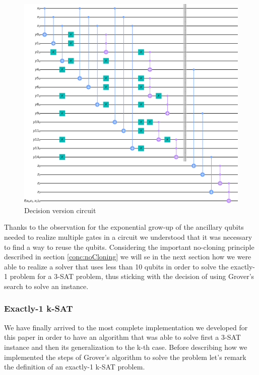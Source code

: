 \documentclass[english]{article}
\begin{document}
				\begin{figure}[h]
					\centering
					\includegraphics[scale=0.25]{DecisionCircuit}
					\caption{
						\label{fig:decisionVersionCircuit}
						Decision version circuit
					}
				\end{figure}
			
				Thanks to the observation for the exponential grow-up of the ancillary qubits needed to realize multiple gates in a circuit we understood that it was necessary to find a way to reuse the qubits. Considering the important no-cloning principle described in section \ref{conc:noCloning} we will se in the next section how we were able to realize a solver that uses less than 10 qubits in order to solve the exactly-1 problem for a 3-SAT problem, thus sticking with the decision of using Grover's search to solve an instance.
			
			\subsubsection{Exactly-1 k-SAT}
			\label{sec:quantumExactlyOne}
				We have finally arrived to the most complete implementation we developed for this paper in order to have an algorithm that was able to solve first a 3-SAT instance and then its generalization to the k-th case. Before describing how we implemented the steps of Grover's algorithm to solve the problem let's remark the definition of an exactly-1 k-SAT problem.
				
\end{document}
